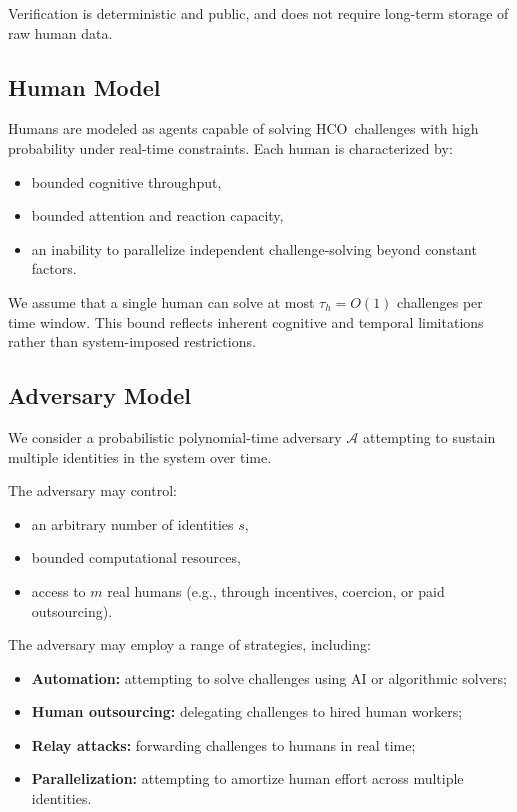 \documentclass[11pt]{article}
\newcommand{\HCO}{HCO\xspace}
\begin{document}
Verification is deterministic and public, and does not require long-term storage of raw human data.

\subsection{Human Model}

Humans are modeled as agents capable of solving \HCO\ challenges with high probability under real-time constraints. Each human is characterized by:
\begin{itemize}
	\item bounded cognitive throughput,
	\item bounded attention and reaction capacity,
	\item an inability to parallelize independent challenge-solving beyond constant factors.
\end{itemize}

We assume that a single human can solve at most $\tau_h = O(1)$ challenges per time window. This bound reflects inherent cognitive and temporal limitations rather than system-imposed restrictions.

\subsection{Adversary Model}

We consider a probabilistic polynomial-time adversary $\mathcal{A}$ attempting to sustain multiple identities in the system over time.

The adversary may control:
\begin{itemize}
	\item an arbitrary number of identities $s$,
	\item bounded computational resources,
	\item access to $m$ real humans (e.g., through incentives, coercion, or paid outsourcing).
\end{itemize}

The adversary may employ a range of strategies, including:
\begin{itemize}
	\item \textbf{Automation:} attempting to solve challenges using AI or algorithmic solvers;
	\item \textbf{Human outsourcing:} delegating challenges to hired human workers;
	\item \textbf{Relay attacks:} forwarding challenges to humans in real time;
	\item \textbf{Parallelization:} attempting to amortize human effort across multiple identities.
\end{itemize}
\end{document}
